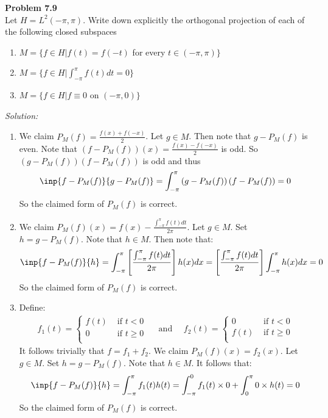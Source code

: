 \documentclass[a4paper, 11pt]{article}
\newenvironment{problem}[2][Problem]
    { \begin{mdframed}[backgroundcolor=gray!20] \textbf{#1 #2} \\}
    {  \end{mdframed}}
\newenvironment{solution}
    {\textit{Solution:}}
    {}
\begin{document}
\begin{problem}{7.9}
    Let $H=L^2(-\pi,\pi)$. Write down explicitly the orthogonal projection of each of the following closed subspaces
    \begin{enumerate}
        \item $M=\{f\in H|f(t)=f(-t)$ for every  $t\in(-\pi,\pi)\}$
        \item $M=\{f\in H|\int_{-\pi}^\pi f(t)dt=0\}$
        \item $M=\{f\in H|f\equiv 0$ on $(-\pi,0)\}$
    \end{enumerate}
\end{problem}
\begin{solution}
    \begin{enumerate}
        \item We claim $P_M(f)=\frac{f(x)+f(-x)}{2}$. Let $g\in M$. Then note that $g-P_M(f)$ is even. Note that $(f-P_M(f))(x)=\frac{f(x)-f(-x)}{2}$ is odd. So $\left(g-P_M(f)\right)\left(f-P_M(f)\right)$  is odd and thus $$\inp{f-P_M(f)}{g-P_M(f)}=\int_{-\pi}^\pi\left(g-P_M(f)\right)\left(f-P_M(f)\right)=0$$So the claimed form of $P_M(f)$ is correct.
        \item We claim $P_M(f)(x)=f(x)-\frac{\int_{-\pi}^\pi f(t)dt}{2\pi}$. Let $g\in M$. Set $h=g-P_M(f)$. Note that $h\in M$. Then note that:
        \begin{align*}
            \inp{f-P_M(f)}{h}=\int_{-\pi}^{\pi}\left[\frac{\int_{-\pi}^\pi f(t)dt}{2\pi}\right]h(x)dx=\left[\frac{\int_{-\pi}^\pi f(t)dt}{2\pi}\right]\int_{-\pi}^\pi h(x)dx=0
        \end{align*}
        So the claimed form of $P_M(f)$ is correct.
        \item Define:
        \begin{align*}
            f_1(t)=\begin{cases}
                f(t)&\text{ if }t<0\\
                0&\text{ if }t\geq 0\\
            \end{cases}
            \quad\text{ \ and\  }\quad
            f_2(t)=\begin{cases}
                0&\text{ if }t< 0\\
                f(t)&\text{ if }t\geq  0\\
            \end{cases}
        \end{align*}
        It follows trivially that $f=f_1+f_2$.  We claim $P_M(f)(x)=f_2(x)$. Let $g\in M$. Set $h=g-P_M(f)$. Note that $h\in M$. It follows that:
        \begin{align*}
            \inp{f-P_M(f)}{h}=\int_{-\pi}^{\pi}f_1(t)h(t)=\int_{-\pi}^{0}f_1(t)\times 0+\int_{0}^{\pi}0\times h(t)=0
        \end{align*}
        So the claimed form of $P_M(f)$ is correct.
    \end{enumerate}
\end{solution}
\end{document}
